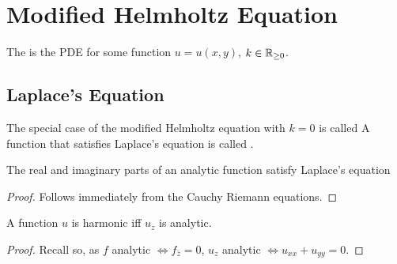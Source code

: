 \documentclass{article}
\begin{document}
\section{Modified Helmholtz Equation}

\begin{definition}
The  is the PDE
for some function $u = u(x,y)$, $k\in\mathbb{R}_{\geq0}$. 
\end{definition}

\subsection{Laplace's Equation}

\begin{definition}
The special case of the modified Helmholtz equation with $k=0$ is called 
A function that satisfies Laplace's equation is called . 
\end{definition}

\begin{prop}
The real and imaginary parts of an analytic function satisfy Laplace's equation
\end{prop}
\begin{proof}
Follows immediately from the Cauchy Riemann equations. 
\end{proof}

\begin{prop}
A function $u$ is harmonic iff $u_z$ is analytic.
\end{prop}
\begin{proof}
Recall 
so, as $f$ analytic $\Leftrightarrow f_{\bar{z}}=0$, $u_{z}$ analytic $\Leftrightarrow u_{xx}+u_{yy} = 0$. 
\end{proof}

\end{document}
